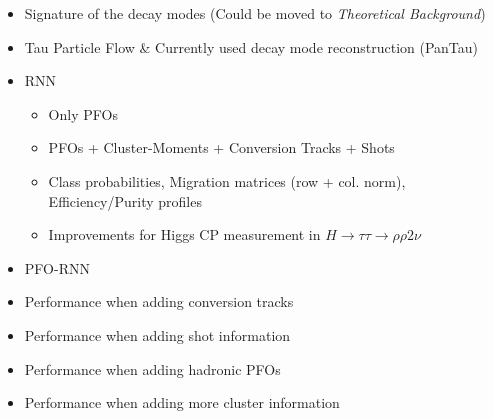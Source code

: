 \begin{itemize}
\item Signature of the decay modes (Could be moved to \textit{Theoretical
    Background})
\item Tau Particle Flow \& Currently used decay mode reconstruction (PanTau)
\item RNN
  \begin{itemize}
  \item Only PFOs
  \item PFOs + Cluster-Moments + Conversion Tracks + Shots
  \item Class probabilities, Migration matrices (row + col. norm),
    Efficiency/Purity profiles
  \item Improvements for Higgs CP measurement in
    $H \rightarrow \tau\tau \rightarrow \rho \rho 2\nu$
  \end{itemize}
\end{itemize}

\begin{itemize}
\item PFO-RNN

\item Performance when adding conversion tracks

\item Performance when adding shot information

\item Performance when adding hadronic PFOs

\item Performance when adding more cluster information

\end{itemize}

